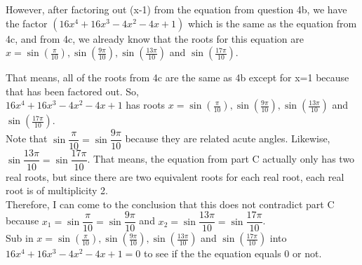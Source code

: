 \documentclass[12pt]{book}
\begin{document}
\begin{enumerate}
\begin{enumerate}
However, after factoring out (x-1) from the equation from question 4b, we have the factor $(16x^4 + 16x^3 - 4x^2 - 4x + 1)$ which is the same as the equation from 4c, and from 4c, we already know that the roots for this equation are $x=\sin(\frac{\pi}{10}), \sin(\frac{9\pi}{10}), \sin(\frac{13\pi}{10})$  and $\sin(\frac{17\pi}{10})$.

That means, all of the roots from 4c are the same as 4b except for x=1 because that has been factored out. So,\\

$16x^4 + 16x^3 - 4x^2 - 4x + 1$ has roots $x=\sin(\frac{\pi}{10}), \sin(\frac{9\pi}{10}), \sin(\frac{13\pi}{10})$ and $\sin(\frac{17\pi}{10})$. \\

Note that $\sin\dfrac{\pi}{10} = \sin\dfrac{9\pi}{10}$ because they are related acute angles. Likewise, $\sin\dfrac{13\pi}{10} = \sin\dfrac{17\pi}{10}$. That means, the equation from part C actually only has two real roots, but since there are two equivalent roots for each real root, each real root is of multiplicity 2.\\


Therefore, I can come to the conclusion that this does not contradict part C because $x_1 = \sin\dfrac{\pi}{10} = \sin\dfrac{9\pi}{10}$ and $x_2 = \sin\dfrac{13\pi}{10} = \sin\dfrac{17\pi}{10}$.\\



\iffalse %
Sub in $x=\sin(\frac{\pi}{10}), \sin(\frac{9\pi}{10}), \sin(\frac{13\pi}{10})$ and $\sin(\frac{17\pi}{10})$ into $16x^4 + 16x^3 - 4x^2 -4x + 1 = 0$ to see if the the equation equals 0 or not.\\


\end{enumerate}
\end{enumerate}
\end{document}
